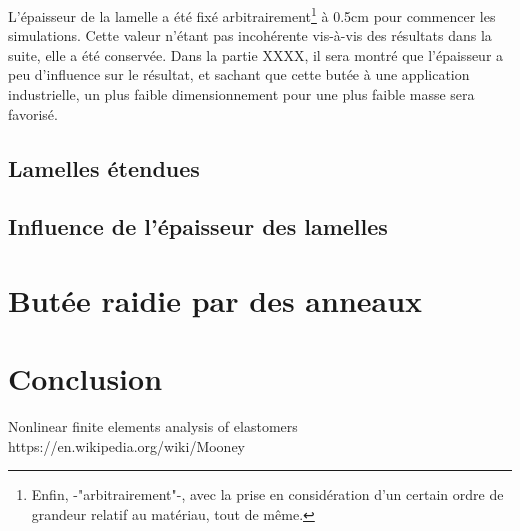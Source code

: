 ﻿ \documentclass{article}
\begin{document}
L'épaisseur de la lamelle a été fixé arbitrairement\footnote{Enfin, -"arbitrairement"-, avec la prise en considération d'un certain ordre de grandeur relatif au matériau, tout de même.} à 0.5cm pour commencer les simulations. Cette valeur n'étant pas incohérente vis-à-vis des résultats dans la suite, elle a été conservée. Dans la partie XXXX, il sera montré que l'épaisseur a peu d'influence sur le résultat, et sachant que cette butée à une application industrielle, un plus faible dimensionnement pour une plus faible masse sera favorisé.

\subsection{Lamelles étendues}

\subsection{Influence de l'épaisseur des lamelles}



\section{Butée raidie par des anneaux}


\section{Conclusion}

\listoffigures

\begin{thebibliography}{9}
 Nonlinear finite elements analysis of elastomers
 https://en.wikipedia.org/wiki/Mooney%
\end{thebibliography}
\end{document}

